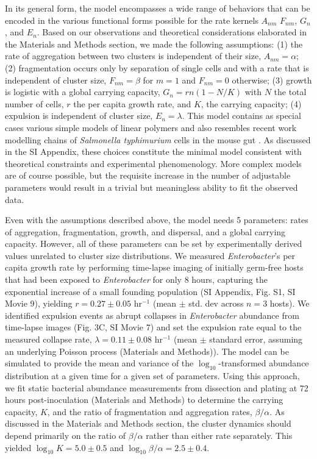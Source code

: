 In its general form, the model encompasses a wide range of behaviors that can be encoded in the various functional forms possible for the rate kernels $A_{nm}$ $F_{nm}$, $G_n$, and $E_n$. Based on our observations and theoretical considerations elaborated in the Materials and Methods section, we made the following assumptions: (1) the rate of aggregation between two clusters is independent of their size, $A_{nm} = \alpha$;  (2) fragmentation occurs only by separation of single cells and with a rate that is independent of cluster size, $F_{nm} = \beta$ for $m=1$ and $F_{nm}=0$ otherwise; (3) growth is logistic with a global carrying capacity, $G_n = rn(1-N/K)$ with $N$ the total number of cells, $r$ the per capita growth rate, and $K$, the carrying capacity; (4) expulsion is independent of cluster size, $E_n = \lambda$.  This model contains as special cases various simple models of linear polymers \cite{krapivsky1996transitional} and also resembles recent work modelling chains of \textit{Salmonella typhimurium} cells in the mouse gut \cite{bansept2019enchained}.  As discussed in the SI Appendix, these choices constitute the minimal model consistent with theoretical constraints and experimental phenomenology. More complex models are of course possible, but the requisite increase in the number of adjustable parameters would result in a trivial but meaningless ability to fit the observed data.
  

Even with the assumptions described above, the model needs 5 parameters: rates of aggregation, fragmentation, growth, and dispersal, and a global carrying capacity. However, all of these parameters can be set by experimentally derived values unrelated to cluster size distributions. We measured \textit{Enterobacter}'s per capita growth rate by performing time-lapse imaging of initially germ-free hosts that had been exposed to \textit{Enterobacter} for only 8 hours, capturing the exponential increase of a small founding population (SI Appendix, Fig. S1, SI Movie 9), yielding $r = 0.27 \pm 0.05$ hr$^{-1}$ (mean $\pm$ std. dev across $n=3$ hosts). We identified expulsion events as abrupt collapses in \textit{Enterobacter} abundance from time-lapse images (Fig. 3C, SI Movie 7) and set the expulsion rate equal to the measured collapse rate, $\lambda = 0.11 \pm 0.08$ hr$^{-1}$ (mean $\pm$ standard error, assuming an underlying Poisson process (Materials and Methods)). The model can be simulated to provide the mean and variance of the $\log_{10}$-transformed abundance distribution at a given time for a given set of parameters. Using this approach, we fit static bacterial abundance measurements from dissection and plating at 72 hours post-inoculation (Materials and Methods) to determine the carrying capacity, $K$, and the ratio of fragmentation and aggregation rates, $\beta/\alpha$. As discussed in the Materials and Methods section, the cluster dynamics should depend primarily on the ratio of $\beta/\alpha$ rather than either rate separately. This yielded $\log_{10}K = 5.0 \pm 0.5$ and $\log_{10}\beta/\alpha =  2.5 \pm 0.4$.


